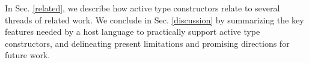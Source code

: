 \documentclass[9pt,preprint]{sigplanconf}
\newcommand{\lstinlinep}[1]{\lstinline[language=Python,basicstyle=\ttfamily\small]{#1}}
\begin{document}


In Sec.  \ref{related}, we describe how active type constructors relate to several threads of related work. We conclude in Sec. \ref{discussion} by summarizing the key features needed by a host language to practically support active type constructors, and delineating present limitations and promising directions for future work. %
\end{document}
